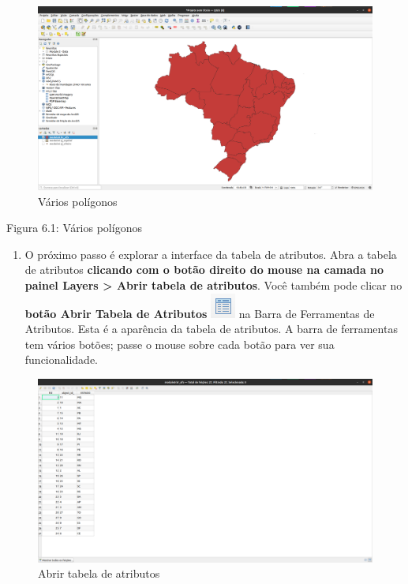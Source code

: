 \documentclass[
]{krantz}
\providecommand{\tightlist}{%
  \setlength{\itemsep}{0pt}\setlength{\parskip}{0pt}}
\begin{document}
\begin{figure}
\centering
\includegraphics{media/modulo6/many-polygons.png}
\caption{Vários polígonos}
\end{figure}

Figura 6.1: Vários polígonos

\begin{enumerate}
\def\labelenumi{\arabic{enumi}.}
\setcounter{enumi}{1}
\tightlist
\item
  O próximo passo é explorar a interface da tabela de atributos. Abra a tabela de atributos \textbf{clicando com o botão direito do mouse na camada no painel Layers \textgreater{} Abrir tabela de atributos}. Você também pode clicar no \textbf{botão Abrir Tabela de Atributos} \includegraphics{media/modulo6/open-attribute-btn.png} na Barra de Ferramentas de Atributos. Esta é a aparência da tabela de atributos. A barra de ferramentas tem vários botões; passe o mouse sobre cada botão para ver sua funcionalidade.
\end{enumerate}

\begin{figure}
\centering
\includegraphics{media/modulo6/attribute-tab.png}
\caption{Abrir tabela de atributos}
\end{figure}
\end{document}
